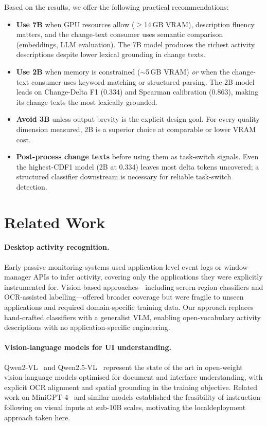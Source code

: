 \documentclass[10pt, twocolumn]{article}
\begin{document}
Based on the results, we offer the following practical recommendations:
\begin{itemize}
  \item \textbf{Use 7B} when GPU resources allow ($\geq$14\,GB VRAM), description
        fluency matters, and the change-text consumer uses semantic comparison
        (embeddings, LLM evaluation). The 7B model produces the richest activity
        descriptions despite lower lexical grounding in change texts.
  \item \textbf{Use 2B} when memory is constrained ($\sim$5\,GB VRAM) \emph{or}
        when the change-text consumer uses keyword matching or structured parsing.
        The 2B model leads on Change-Delta F1 (0.334) and Spearman calibration
        (0.863), making its change texts the most lexically grounded.
  \item \textbf{Avoid 3B} unless output brevity is the explicit design goal. For
        every quality dimension measured, 2B is a superior choice at comparable
        or lower VRAM cost.
  \item \textbf{Post-process change texts} before using them as task-switch signals.
        Even the highest-CDF1 model (2B at 0.334) leaves most delta tokens uncovered;
        a structured classifier downstream is necessary for reliable task-switch
        detection.
\end{itemize}

\section{Related Work}
\label{sec:related}

\paragraph{Desktop activity recognition.}
Early passive monitoring systems used application-level event logs or window-manager
APIs to infer activity, covering only the applications they were explicitly
instrumented for. Vision-based approaches---including screen-region classifiers and
OCR-assisted labelling---offered broader coverage but were fragile to unseen
applications and required domain-specific training data. Our approach replaces
hand-crafted classifiers with a generalist VLM, enabling open-vocabulary activity
descriptions with no application-specific engineering.

\paragraph{Vision-language models for UI understanding.}
Qwen2-VL~\cite{wang2024qwen2vl} and Qwen2.5-VL~\cite{qwen25vl2025} represent the
state of the art in open-weight vision-language models optimised for document and
interface understanding, with explicit OCR alignment and spatial grounding in the
training objective. Related work on MiniGPT-4~\cite{zhu2023minigpt4} and similar
models established the feasibility of instruction-following on visual inputs at
sub-10B scales, motivating the localdeployment approach taken here.
\end{document}
